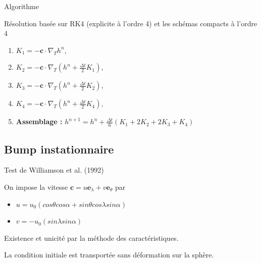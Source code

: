 \documentclass[11pt]{beamer}
\begin{document}
\begin{frame}{Algorithme}
\begin{block}{}
Résolution basée sur RK4 (explicite à l'ordre 4) et les schémas compacts à l'ordre 4
\end{block}

\begin{enumerate}
\item $K_1 = - \mathbf{c} \cdot \nabla_T h^n$,\\
\item $K_2 = - \mathbf{c} \cdot \nabla_T \left( h^n + \frac{\Delta t}{2} K_1 \right)$,\\
\item $K_3 = - \mathbf{c} \cdot \nabla_T \left( h^n + \frac{\Delta t}{2} K_2 \right)$,\\
\item $K_4 = - \mathbf{c} \cdot \nabla_T \left( h^n + \frac{\Delta
  t}{2} K_4 \right)$,\\
\item \textbf{Assemblage :} $h^{n+1} = h^n + \frac{\Delta t}{6}
  \left(K_1 + 2 K_2 + 2 K_3 + K_4  \right)$
\end{enumerate}

\end{frame}



\subsection{Bump instationnaire}
\begin{frame}{Test de Williamson et al. (1992)}

On impose la vitesse $\mathbf{c} = u \mathbf{e}_{\lambda} + v \mathbf{e}_{\theta}$ par 
\begin{itemize}
\item $u = u_0 \left( cos \theta cos \alpha + sin \theta cos \lambda sin \alpha \right)$
\item $v = - u_0 \left( sin \lambda sin \alpha \right)$
\end{itemize}

\begin{exampleblock}{}
Existence et unicité par la méthode des caractéristiques.
\end{exampleblock}

\begin{block}{}
La condition initiale est transportée sans déformation sur la sphère.
\end{block}
\end{frame}
\end{document}
